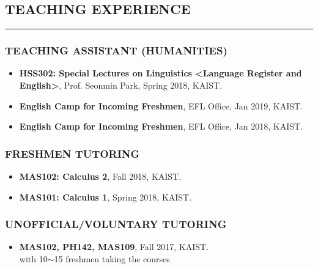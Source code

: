 \documentclass[10pt,a4]{article}
\begin{document}
\begin{small}
\subsection*{TEACHING EXPERIENCE}
\hrule
\vspace{0.2cm}

\subsubsection*{TEACHING ASSISTANT (HUMANITIES)}
\begin{itemize}


\item {\bf HSS302: Special Lectures on Linguistics \textless Language Register and English\textgreater}, Prof. Seonmin Park, Spring 2018, KAIST.

\item {\bf English Camp for Incoming Freshmen}, EFL Office, Jan 2019, KAIST.

\item {\bf English Camp for Incoming Freshmen}, EFL Office, Jan 2018, KAIST.

\end{itemize}

\subsubsection*{FRESHMEN TUTORING}
\begin{itemize}

\item {\bf MAS102: Calculus 2}, Fall 2018, KAIST.

\item {\bf MAS101: Calculus 1}, Spring 2018, KAIST.

\end{itemize}

\subsubsection*{UNOFFICIAL/VOLUNTARY TUTORING}
\begin{itemize}

\item {\bf MAS102, PH142, MAS109}, Fall 2017, KAIST. \\
with 10$\sim$15 freshmen taking the courses


\end{itemize}
\end{small}
\end{document}
